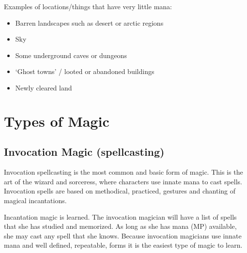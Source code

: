 \documentclass[twoside]{book}
\begin{document}
    {  
      Examples of locations/things that have very little
             mana: 
    }
  
\begin{itemize}
      
  \item   Barren landscapes such as desert or arctic regions
               
  \item   Sky 
  \item   Some underground caves or dungeons 
  \item   `Ghost towns' / looted or abandoned
               buildings 
  \item   Newly cleared land 
\end{itemize}
  
    

\section{Types of Magic}
    
    

\subsection{Invocation Magic (spellcasting)}
    
    {  
      Invocation spellcasting is the most common and
               basic form of magic. This is the art of the wizard and
               sorceress, where characters use innate mana to cast
               spells. Invocation spells are based on methodical,
               practiced, gestures and chanting of magical incantations.
               
    }
  
    {  
      Incantation magic is learned. The invocation
               magician will have a list of spells that she has studied
               and memorized. As long as she has mana (MP) available, she
               may cast any spell that she knows. Because invocation
               magicians use innate mana and well defined, repeatable,
               forms it is the easiest type of magic to learn. 
    }
  
\end{document}
